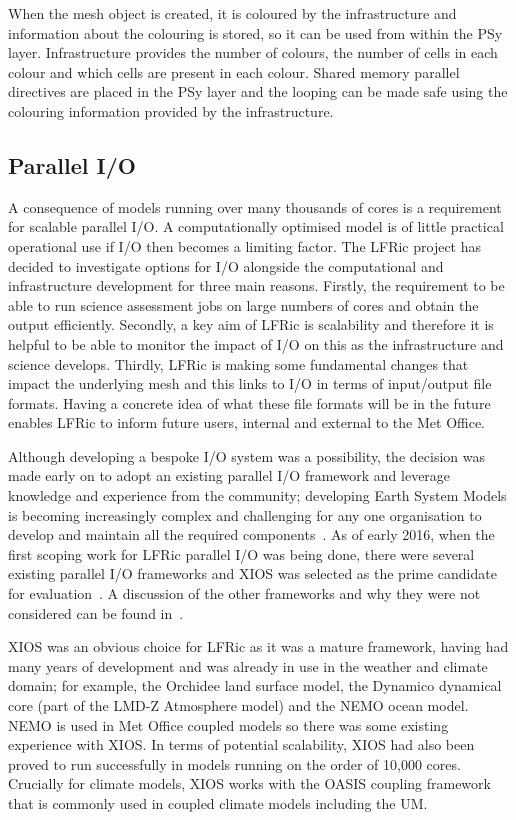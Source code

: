 \documentclass[times]{elsarticle}
\begin{document}
When the mesh object is created, it is coloured by the infrastructure
and information about the colouring is stored, so it can be used from
within the PSy layer. Infrastructure provides the number of colours,
the number of cells in each colour and which cells are present in each
colour. Shared memory parallel directives are placed in the PSy layer
and the looping can be made safe using the colouring information
provided by the infrastructure. 

\subsection{\label{sec:io}Parallel I/O}

A consequence of models running over many thousands of cores is a requirement
for scalable parallel I/O. A computationally optimised model is of little practical
operational use if I/O then becomes a limiting factor. The LFRic project has
decided to investigate options for I/O alongside the computational
and infrastructure development for three main reasons. Firstly, the requirement
to be able to run science assessment jobs on large numbers of cores and obtain the
output efficiently. Secondly, a key aim of LFRic is scalability and therefore it is
helpful to be able to monitor the impact of I/O on this as the infrastructure and
science develops. Thirdly, LFRic is making some fundamental changes that impact the
underlying mesh and this links to I/O in terms of input/output file formats. Having
a concrete idea of what these file formats will be in the future enables LFRic to
inform future users, internal and external to the Met Office.

Although developing a bespoke I/O system was a possibility, the decision was
made early on to adopt an existing parallel I/O framework and leverage knowledge and
experience from the community; developing Earth System Models is becoming increasingly
complex and challenging for any one organisation to develop and maintain all the required
components~\cite{gmd-2017-186}.
As of early 2016, when the first scoping work for LFRic parallel I/O was being done,
there were several existing parallel I/O frameworks and XIOS was selected as the prime
candidate for evaluation~\cite{XIOSWiki}. A discussion of the other frameworks and why
they were not considered can be found in~\cite{Adams2018}.

XIOS was an obvious choice for LFRic as it was a mature framework, having had many years
of development and was already in use in the weather and climate domain; for example,
the Orchidee land surface model, the Dynamico dynamical core (part of the LMD-Z
Atmosphere model) and the NEMO ocean model. NEMO is used in Met Office coupled
models so there was some existing experience with XIOS. In terms of potential scalability,
XIOS had also been proved to run successfully in models running on the order of 10,000
cores. Crucially for climate models, XIOS works with the OASIS coupling framework that
is commonly used in coupled climate models including the UM. 
\end{document}
